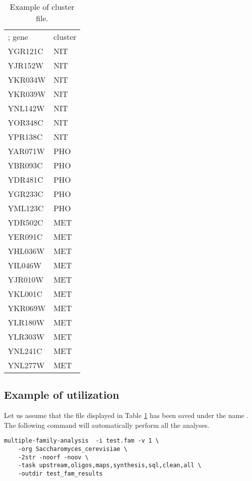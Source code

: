\begin{table}
\begin{center}
\begin{tabular}{ll}
\hline
; gene & cluster \\
YGR121C & NIT \\
YJR152W & NIT \\
YKR034W & NIT \\
YKR039W & NIT \\
YNL142W & NIT \\
YOR348C & NIT \\
YPR138C & NIT \\
YAR071W & PHO \\
YBR093C & PHO \\
YDR481C & PHO \\
YGR233C & PHO \\
YML123C & PHO \\
YDR502C & MET \\
YER091C & MET \\
YHL036W & MET \\
YIL046W & MET \\
YJR010W & MET \\
YKL001C & MET \\
YKR069W & MET \\
YLR180W & MET \\
YLR303W & MET \\
YNL241C & MET \\
YNL277W & MET \\
\hline
\end{tabular}
\end{center}
\caption{\label{table:cluster_file} Example of cluster file.}
\end{table}



\subsection{Example of utilization}

Let us assume that the file displayed in Table
\ref{table:cluster_file} has been saved under the name
. The following command will automatically perform all
the analyses. 

\begin{verbatim}
multiple-family-analysis  -i test.fam -v 1 \
    -org Saccharomyces_cerevisiae \
    -2str -noorf -noov \
    -task upstream,oligos,maps,synthesis,sql,clean,all \
    -outdir test_fam_results
\end{verbatim}

